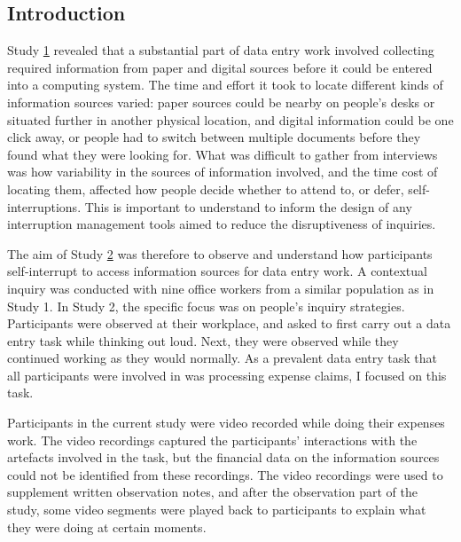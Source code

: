 \subsection{Introduction}
Study \hyperref[st:Study1]{1}  revealed that a substantial part of data entry work involved collecting required information from paper and digital sources before it could be entered into a computing system. The time and effort it took to locate different kinds of information sources varied: paper sources could be nearby on people's desks or situated further in another physical location, and digital information could be one click away, or people had to switch between multiple documents before they found what they were looking for. What was difficult to gather from interviews was how variability in the sources of information involved, and the time cost of locating them, affected how people decide whether to attend to, or defer, self-interruptions. This is important to understand to inform the design of any interruption management tools aimed to reduce the disruptiveness of inquiries.


The aim of Study \hyperref[st:Study2]{2} was therefore to observe and understand how participants self-interrupt to access information sources for data entry work. A contextual inquiry was conducted with nine office workers from a similar population as in Study 1. In Study 2, the specific focus was on people's inquiry strategies. Participants were observed at their workplace, and asked to first carry out a data entry task while thinking out loud. Next, they were observed while they continued working as they would normally. As a prevalent data entry task that all participants were involved in was processing expense claims, I focused on this task.

Participants in the current study were video recorded while doing their expenses work. The video recordings captured the participants' interactions with the artefacts involved in the task, but the financial data on the information sources could not be identified from these recordings. The video recordings were used to supplement written observation notes, and after the observation part of the study, some video segments were played back to participants to explain what they were doing at certain moments.

